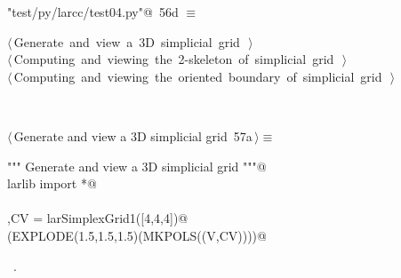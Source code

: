 \documentclass[11pt,oneside]{article}    %
\begin{document}
\begin{flushleft} \small
\begin{minipage}{\linewidth} \label{scrap104}
\protect{}\verb@"test/py/larcc/test04.py"@\nobreak\ {\footnotesize 56d }$\equiv$
\vspace{-1ex}
\begin{list}{}{} \item
\mbox{}\verb@@\hbox{$\langle\,$Generate and view a 3D simplicial grid\nobreak\ {\footnotesize {}}$\,\rangle$}\verb@@\\
\mbox{}\verb@@\hbox{$\langle\,$Computing and viewing the 2-skeleton of simplicial grid\nobreak\ {\footnotesize {}}$\,\rangle$}\verb@@\\
\mbox{}\verb@@\hbox{$\langle\,$Computing and viewing the oriented boundary of simplicial grid\nobreak\ {\footnotesize {}}$\,\rangle$}\verb@@\\
\mbox{}\verb@@{\NWsep}
\end{list}
\vspace{-2ex}
\end{minipage}\\[4ex]
\end{flushleft}


\begin{flushleft} \small \label{scrap105}
\protect{}$\langle\,$Generate and view a 3D simplicial grid\nobreak\ {\footnotesize 57a}$\,\rangle\equiv$
\vspace{-1ex}
\begin{list}{}{} \item
\mbox{}\verb@""" Generate and view a 3D simplicial grid """@\\
\mbox{}\verb@from larlib import *@\\
\mbox{}\verb@@\\
\mbox{}\verb@V,CV = larSimplexGrid1([4,4,4])@\\
\mbox{}\verb@VIEW(EXPLODE(1.5,1.5,1.5)(MKPOLS((V,CV))))@\\
\mbox{}\verb@@{\NWsep}
\end{list}
\vspace{-1ex}
\footnotesize\addtolength{\baselineskip}{-1ex}
\begin{list}{}{\setlength{\itemsep}{-\parsep}\setlength{\itemindent}{-\leftmargin}}
\item \NWtxtMacroRefIn\ .
\end{list}
\end{flushleft}
\end{document}
